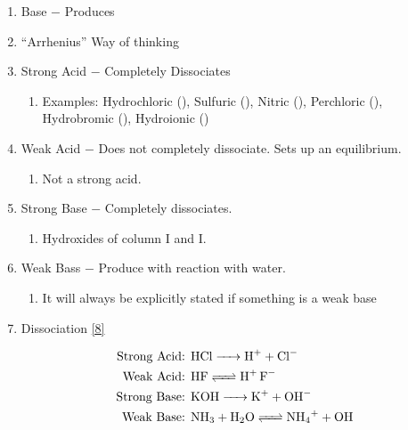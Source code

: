 \documentclass[12pt]{article}
\begin{document}
\begin{itemize}
\begin{enumerate}
    \item Base $-$ Produces 

    \item ``Arrhenius'' Way of thinking

    \item Strong Acid $-$ Completely Dissociates

      \begin{enumerate}
        \item Examples: Hydrochloric (), Sulfuric (), Nitric (), Perchloric (), Hydrobromic (), Hydroionic ()
      \end{enumerate}

    \item Weak Acid $-$ Does not completely dissociate. Sets up an equilibrium.

      \begin{enumerate}
        \item Not a strong acid.
      \end{enumerate}

    \item Strong Base $-$ Completely dissociates.

      \begin{enumerate}
        \item Hydroxides of column I and I.
      \end{enumerate}

    \item Weak Bass $-$ Produce  with reaction with water.

      \begin{enumerate}
        \item It will always be explicitly stated if something is a weak base
      \end{enumerate}

    \item Dissociation \eqref{8}

      \begin{equation}
        \begin{split}
          \text{Strong Acid: } & \ce{HCl -> H+ + Cl-} \\
          \text{Weak Acid: } & \ce{HF <=> H+ F-}\\
          \text{Strong Base: } & \ce{KOH -> K+ + OH-}\\
          \text{Weak Base: } & \ce{NH3 + H2O <=> NH4+ + OH}\\
        \end{split}
        \label{8}
      \end{equation}


\end{enumerate}
\end{itemize}
\end{document}
